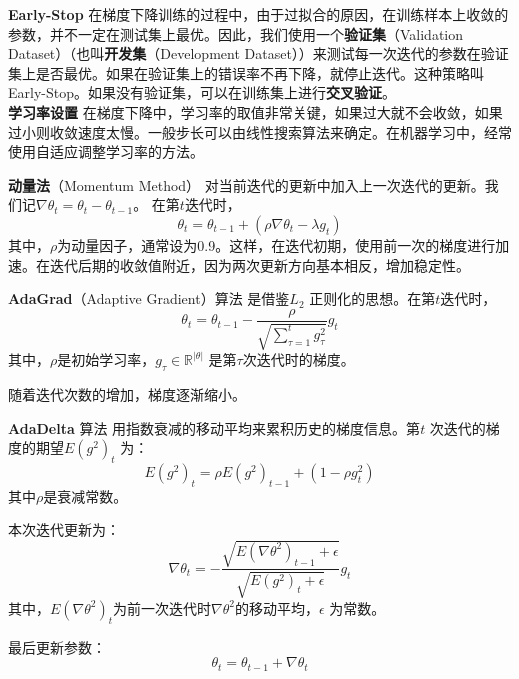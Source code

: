 \documentclass[11pt,fleqn, UTF8]{ctexbook} %
\begin{document}
\textbf{Early-Stop}
在梯度下降训练的过程中，由于过拟合的原因，在训练样本上收敛的参数，并不一定在测试集上最优。因此，我们使用一个\textbf{验证集}（Validation Dataset）（也叫\textbf{开发集}（Development Dataset））来测试每一次迭代的参数在验证集上是否最优。如果在验证集上的错误率不再下降，就停止迭代。这种策略叫Early-Stop。如果没有验证集，可以在训练集上进行\textbf{交叉验证}。\\

\textbf{学习率设置}
在梯度下降中，学习率的取值非常关键，如果过大就不会收敛，如果过小则收敛速度太慢。一般步长可以由线性搜索算法来确定。在机器学习中，经常使用自适应调整学习率的方法。

\textbf{动量法}（Momentum Method）\cite{rumelhart1988learning} 对当前迭代的更新中加入上一次迭代的更新。我们记$\nabla \theta_t = \theta_t-\theta_{t-1}$。 在第$t$迭代时，
\begin{equation}\label{3.21}
  \theta_t = \theta_{t-1} +(\rho\nabla\theta_{t}-\lambda g_t)
\end{equation}
其中，$\rho$为动量因子，通常设为0.9。这样，在迭代初期，使用前一次的梯度进行加速。在迭代后期的收敛值附近，因为两次更新方向基本相反，增加稳定性。

\textbf{AdaGrad}（Adaptive Gradient）算法\cite{duchi2011adaptive} 是借鉴$L_2$ 正则化的思想。在第$t$迭代时，
\begin{equation}\label{3.22}
  \theta_t = \theta_{t-1}-\frac{\rho}{\sqrt{\sum_{\tau=1}^t g_{\tau}^2}}g_t
\end{equation}
其中，$\rho$是初始学习率，$g_{\tau}\in \mathbb{R}^{|\theta|}$ 是第$\tau$次迭代时的梯度。

随着迭代次数的增加，梯度逐渐缩小。

\textbf{AdaDelta} 算法\cite{zeiler2012adadelta} 用指数衰减的移动平均来累积历史的梯度信息。第$t$ 次迭代的梯度的期望$E(g^2)_t$ 为：
\begin{equation}\label{3.23}
  E(g^2)_t=\rho E(g^2)_{t-1}+(1-\rho g_t^2)
\end{equation}
其中$\rho$是衰减常数。

本次迭代更新为：
\begin{equation}\label{3.24}
  \nabla\theta_t=-\frac{\sqrt{E(\nabla\theta^2)_{t-1}+\epsilon}}{\sqrt{E(g^2)_{t}+\epsilon}}g_t
\end{equation}
其中，$E(\nabla\theta^2)_t$为前一次迭代时$\nabla\theta^2$的移动平均，$\epsilon$ 为常数。

最后更新参数：
\begin{equation}\label{3.25}
  \theta_t=\theta_{t-1}+\nabla\theta_t
\end{equation}
\end{document}
